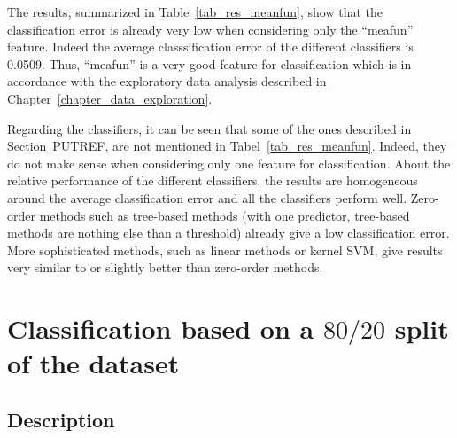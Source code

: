 The results, summarized in Table~\ref{tab_res_meanfun}, show that the classification error is already very low when considering only the ``meafun'' feature. Indeed the average classsification error of the different classifiers is \num{0.0509}. Thus, ``meafun'' is a very good feature for classification which is in accordance with the exploratory data analysis described in Chapter~\ref{chapter_data_exploration}. 

Regarding the classifiers, it can be seen that some of the ones described in Section~PUTREF, are not mentioned in Tabel~\ref{tab_res_meanfun}. Indeed, they do not make sense when considering only one feature for classification. 
About the relative performance of the different classifiers, the results are homogeneous around the average classification error and all the classifiers perform well. Zero-order methods such as tree-based methods (with one predictor, tree-based methods are nothing else than a threshold) already give a low classification error. More sophisticated methods, such as linear methods or kernel SVM, give results very similar to or slightly better than zero-order methods.

\section{Classification based on a $80/20$ split of the dataset}
\label{sec_naive_strat}
\subsection{Description}
